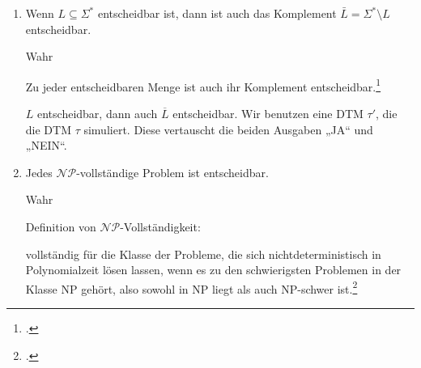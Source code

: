 \documentclass{lehramt-informatik-aufgabe}
\begin{document}
\begin{enumerate}

\item Wenn $L \subseteq \Sigma^*$ entscheidbar ist, dann ist auch das
Komplement $\bar L = \Sigma^* \setminus L$ entscheidbar.

\begin{liAntwort}
Wahr

Zu jeder entscheidbaren Menge ist auch ihr Komplement
entscheidbar.\footcite{wiki:entscheidbar}

$L$ entscheidbar, dann auch $\overline{L}$ entscheidbar. Wir benutzen
eine DTM $\tau'$, die die DTM $\tau$ simuliert. Diese vertauscht die
beiden Ausgaben „JA“ und „NEIN“.
\end{liAntwort}


\item Jedes $\mathcal{NP}$-vollständige Problem ist entscheidbar.

\begin{liAntwort}
Wahr

Definition von $\mathcal{NP}$-Vollständigkeit:

vollständig für die Klasse der Probleme, die sich nichtdeterministisch
in Polynomialzeit lösen lassen, wenn es zu den schwierigsten Problemen
in der Klasse NP gehört, also sowohl in NP liegt als auch NP-schwer
ist.\footcite{wiki:np-vollstaendig}
\end{liAntwort}
\end{enumerate}
\end{document}
